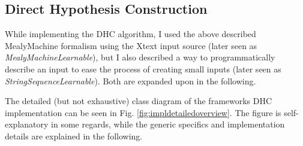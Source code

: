 \subsection{Direct Hypothesis Construction}

While implementing the DHC algorithm, I used the above described MealyMachine formalism using the Xtext input source (later seen as \emph{MealyMachineLearnable}), but I also described a way to programmatically describe an input to ease the process of creating small inputs (later seen as \emph{StringSequenceLearnable}). Both are expanded upon in the following.





\label{item:stringsequencelearnable}

The detailed (but not exhaustive) class diagram of the frameworks DHC implementation can be seen in Fig. \ref{fig:impldetailedoverview}. The figure is self-explanatory in some regards, while the generic specifics and implementation details are explained in the following.

